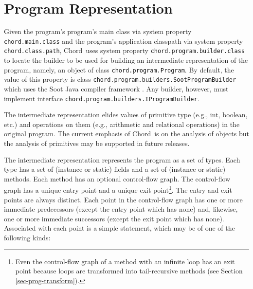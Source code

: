 \documentclass{article}
\providecommand\Chord{{Chord}}
\begin{document}
\texonly{\newpage}
\section{Program Representation}
\label{sec-prog-build}

Given the program's program's main class via system property {\tt chord.main.class} and the
program's application classpath via system property {\tt chord.class.path},
\Chord\ uses system property {\tt chord.program.builder.class} to locate the
builder to be used for building an intermediate representation of the program,
namely, an object of class {\tt chord.program.Program}.
By default, the value of this property is class {\tt chord.program.builders.SootProgramBuilder}
which uses the Soot Java compiler framework \cite{Soot}.
Any builder, however, must implement interface
{\tt chord.program.builders.IProgramBuilder}.

The intermediate representation
elides values of primitive type (e.g., int, boolean, etc.) and operations
on them (e.g., arithmetic and relational operations) in the original program.
The current emphasis of \Chord\ is on the analysis of objects
but the analysis of primitives may be supported in future
releases.

The intermediate representation represents the program as a set of types.
Each type has a set of (instance or static) fields and a set of
(instance or static) methods.
Each method has an optional control-flow graph.
The control-flow graph has a unique entry point and
a unique exit point\footnote{Even the control-flow graph of a method with an infinite loop
has an exit point because loops are transformed into tail-recursive methods
(see Section \ref{sec-prog-transform}).}.
The entry and exit points are always distinct.
Each point in the control-flow graph has one or more immediate predecessors
(except the entry point which has none) and, likewise,
one or more immediate successors (except the exit point which has none).
Associated with each point is a simple statement, which may be of one of
the following kinds:
\end{document}
